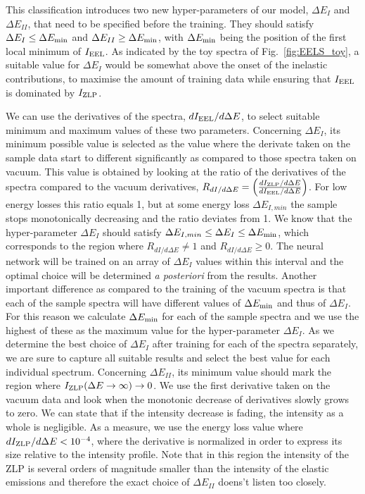 This classification introduces two new hyper-parameters of our model, $\Delta E_I$ and
$\Delta E_{II}$, that need to be specified before the training.
%
They should satisfy $\Delta E_I \le \Delta E_{\rm min}$ and $\Delta E_{II} \ge \Delta E_{\rm min}$,
with $\Delta E_{\rm min}$ being the position of the first local minimum of $I_{\rm EEL}$.
%
As indicated by the toy spectra of Fig.~\ref{fig:EELS_toy}, a suitable value for $\Delta E_{I}$
would be somewhat above the onset of the inelastic contributions, to maximise
the amount of training data while ensuring that $I_{\rm EEL}$ is dominated
by $I_{\rm ZLP}$.

We can use the derivatives of the spectra, $dI_{\rm EEL}/d\Delta E$, to select suitable minimum and
maximum values of these two parameters.
%
Concerning $\Delta E_I $, its minimum possible value is selected as the value where the derivate taken on the sample
data start to different significantly as compared to those spectra taken on vacuum.
%
This value is obtained by looking at the ratio of the derivatives of the spectra compared to the vacuum derivatives,
$R_{dI/d \Delta E} =  \left( \frac{dI_{\rm ZLP}/d\Delta E}{dI_{\rm EEL}/d\Delta E}\right)$. 
%
For low energy losses this ratio equals 1, but at some energy loss $\Delta E_{I,min}$ the
sample stops monotonically decreasing and the ratio deviates from 1. 
%
We know that the hyper-parameter $\Delta E_I$ should satisfy $\Delta E_{I,min} \le \Delta E_I \le \Delta E_{\rm min}$,
which corresponds to the region where $R_{dI/d \Delta E} \ne  1$ and $R_{dI/d \Delta E} \ge 0$.
%
The neural network will be trained on an array of $\Delta E_I$ values within this interval and 
the optimal choice will be determined {\it a posteriori} from the results.
%
Another important difference as compared to the training of the vacuum spectra is that each of the sample
spectra will have different values of $\Delta E_{\rm min}$ and thus of $\Delta E_I$. 
%
For this reason we calculate $\Delta E_{\rm min}$  for each of the sample spectra and we use the highest of these
as the maximum value for the hyper-parameter $\Delta E_I$. 
%
As we determine the best choice of $\Delta E_I$ after training for each of the spectra separately, 
we are sure to capture all suitable results and select the best value for each individual spectrum. 
%
Concerning $\Delta E_{II}$, its minimum value should mark the region where $I_{\rm ZLP}(\Delta E\to \infty)\to 0$. 
%
We use the first derivative taken on the vacuum data and look when the monotonic decrease of derivatives
slowly grows to zero. We can state that if the intensity decrease is fading, the intensity as a whole is 
negligible. 
%
As a measure, we use the energy loss value where $dI_{\rm ZLP}/d\Delta E < 10^{-4}$, where the derivative is normalized
in order to express its size relative to the intensity profile.
%
Note that in this region the intensity of the ZLP is several orders of magnitude smaller than the intensity 
of the elastic emissions and therefore the exact choice of $\Delta E_{II}$ doens't listen too closely.
